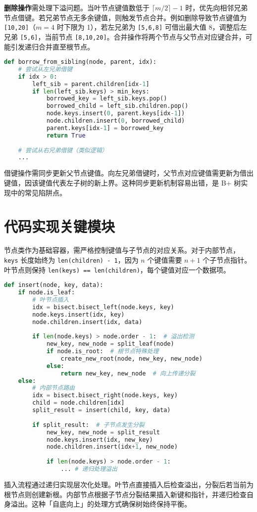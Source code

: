 \textbf{删除操作}需处理下溢问题。当叶节点键值数低于 $\lceil m/2 \rceil -1$ 时，优先向相邻兄弟节点借键。若兄弟节点无多余键值，则触发节点合并。例如删除导致节点键值为 \texttt{[10,20]}（$m=4$ 时下限为 1），若左兄弟为 \texttt{[5,6,8]} 可借出最大值 8，调整后左兄弟 \texttt{[5,6]}，当前节点 \texttt{[8,10,20]}。合并操作将两个节点与父节点对应键合并，可能引发递归合并直至根节点。\par
\begin{lstlisting}[language=python]
def borrow_from_sibling(node, parent, idx):
    # 尝试从左兄弟借键
    if idx > 0:
        left_sib = parent.children[idx-1]
        if len(left_sib.keys) > min_keys:
            borrowed_key = left_sib.keys.pop()
            borrowed_child = left_sib.children.pop()
            node.keys.insert(0, parent.keys[idx-1])
            node.children.insert(0, borrowed_child)
            parent.keys[idx-1] = borrowed_key
            return True
            
    # 尝试从右兄弟借键（类似逻辑）
    ...
\end{lstlisting}
借键操作需同步更新父节点键值。向左兄弟借键时，父节点对应键值需更新为借出键值，因该键值代表左子树的新上界。这种同步更新机制容易出错，是 B+ 树实现中的常见陷阱点。\par
\chapter{代码实现关键模块}
节点类作为基础容器，需严格控制键值与子节点的对应关系。对于内部节点，\texttt{keys} 长度始终为 \texttt{len(children) - 1}，因为 $n$ 个键值需要 $n+1$ 个子节点指针。叶节点则保持 \texttt{len(keys) == len(children)}，每个键值对应一个数据项。\par
\begin{lstlisting}[language=python]
def insert(node, key, data):
    if node.is_leaf:
        # 叶节点插入
        idx = bisect.bisect_left(node.keys, key)
        node.keys.insert(idx, key)
        node.children.insert(idx, data)
        
        if len(node.keys) > node.order - 1:  # 溢出检测
            new_key, new_node = split_leaf(node)
            if node.is_root:  # 根节点特殊处理
                create_new_root(node, new_key, new_node)
            else:
                return new_key, new_node  # 向上传递分裂
    else:
        # 内部节点路由
        idx = bisect.bisect_right(node.keys, key)
        child = node.children[idx]
        split_result = insert(child, key, data)
        
        if split_result:  # 子节点发生分裂
            new_key, new_node = split_result
            node.keys.insert(idx, new_key)
            node.children.insert(idx+1, new_node)
            
            if len(node.keys) > node.order - 1:
                ... # 递归处理溢出
\end{lstlisting}
插入流程通过递归实现层次化处理。叶节点直接插入后检查溢出，分裂后若当前为根节点则创建新根。内部节点根据子节点分裂结果插入新键和指针，并递归检查自身溢出。这种「自底向上」的处理方式确保树始终保持平衡。\par
